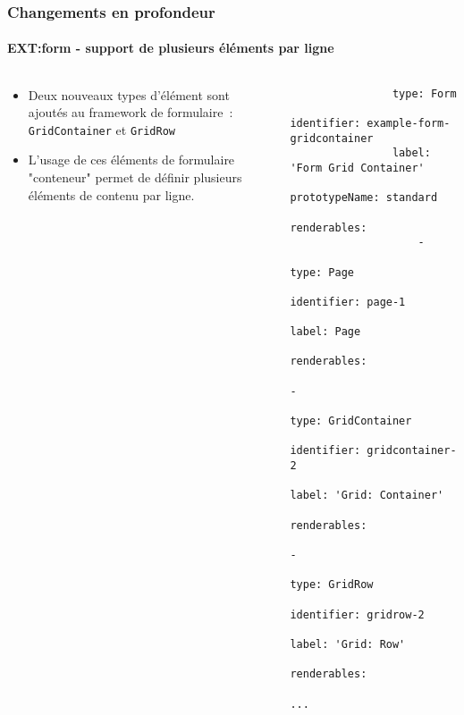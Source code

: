 \begin{frame}[fragile]
	\frametitle{Changements en profondeur}
	\framesubtitle{EXT:form - support de plusieurs éléments par ligne}

	\lstset{basicstyle=\tiny\ttfamily}

	\begin{columns}[T]
		\begin{column}{0.5\textwidth}
			\begin{itemize}
				\item Deux nouveaux types d'élément sont ajoutés au framework de formulaire~: \texttt{GridContainer}
					et \texttt{GridRow}

				\item L'usage de ces éléments de formulaire "conteneur" permet de définir plusieurs éléments de
					contenu par ligne.
			\end{itemize}
		\end{column}
		\begin{column}{0.5\textwidth}
			\begin{lstlisting}
				type: Form
				identifier: example-form-gridcontainer
				label: 'Form Grid Container'
				prototypeName: standard
				renderables:
				    -
				        type: Page
				        identifier: page-1
				        label: Page
				        renderables:
				            -
				                type: GridContainer
				                identifier: gridcontainer-2
				                label: 'Grid: Container'
				                renderables:
				                    -
				                        type: GridRow
				                        identifier: gridrow-2
				                        label: 'Grid: Row'
				                        renderables:
				                        ...
			\end{lstlisting}
		\end{column}
	\end{columns}

\end{frame}



